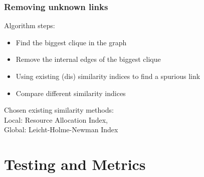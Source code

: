 \documentclass{beamer}
\begin{document}
\begin{frame}
 \frametitle{Removing unknown links}
    Algorithm steps:
    \begin{itemize}
        \item Find the biggest clique in the graph
        \item Remove the internal edges of the biggest clique
        \item Using existing (dis) similarity indices to find a spurious link
        \item Compare different similarity indices
    \end{itemize}
Chosen existing similarity methods: \\
Local: Resource Allocation Index,\\
Global: Leicht-Holme-Newman Index
\end{frame}




\section{Testing and Metrics}
\end{document}
